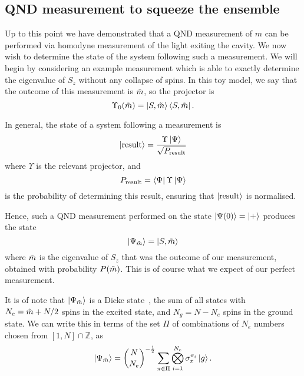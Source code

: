 \subsection{QND measurement to squeeze the ensemble}

Up to this point we have demonstrated that a QND measurement of $m$ can be
performed via homodyne measurement of the light exiting the cavity. We now wish
to determine the state of the system following such a measurement. We will
begin by considering an example measurement which is able to exactly determine
the eigenvalue of $S_z$ without any collapse of spins. In this toy model, we
say that the outcome of this measurement is $\tilde{m}$, so the projector is
%
\begin{equation}
  \Upsilon_0(\tilde{m}) = \ket{S, \tilde{m}}\bra{S, \tilde{m}}.
\end{equation}

In general, the state of a system following a measurement
is~\cite{gerry_knight_2004}
%
\begin{equation}
  \ket{\text{result}} = \frac{\Upsilon\ket{\Psi}}{\sqrt{P_\text{result}}}
  \label{squeeze:eqn:projresult}
\end{equation}
%
where $\Upsilon$ is the relevant projector, and
%
\begin{equation}
  P_\text{result} = \bra{\Psi}\Upsilon\ket{\Psi}
\end{equation}
%
is the probability of determining this result, ensuring that
$\ket{\text{result}}$ is normalised.

Hence, such a QND measurement performed on the state $\ket{\Psi(0)} =
\ket{+}$ produces the state
%
\begin{equation}
  \ket{\Psi_{\tilde{m}}} = \ket{S, \tilde{m}}
\end{equation}
%
where $\tilde{m}$ is the eigenvalue of $S_z$ that was the outcome of our
measurement, obtained with probability $P(\tilde{m})$. This is of course what we
expect of our perfect measurement.

It is of note that $\ket{\Psi_{\tilde{m}}}$ is a Dicke
state~\cite{Baertschi2019}, the sum of all states with $N_e = \tilde{m} + N/2$
spins in the excited state, and $N_g = N - N_e$ spins in the ground state.  We
can write this in terms of the set $\Pi$ of combinations of $N_e$ numbers
chosen from $[1,N]\cap\mathbb{Z}$, as
%
\begin{equation}
  \ket{\Psi_{\tilde{m}}} = \binom{N}{N_e}^{-\frac{1}{2}}\sum_{\pi \in \Pi}
  \bigotimes_{i=1}^{N_e} \sigma_x^{\pi_i} \ket{g}.
\end{equation}

